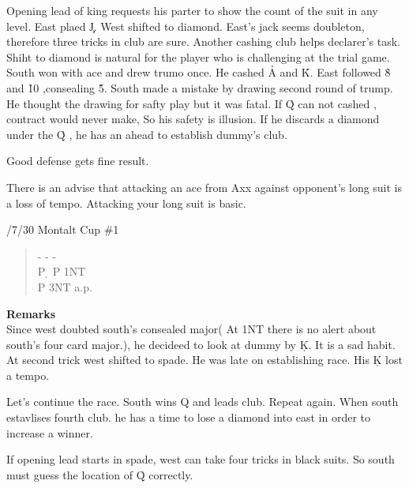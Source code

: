 Opening lead of king requests his parter to show the count of
the suit in any level. East plaed \c J. West shifted to diamond.
East's jack seems doubleton, therefore three tricks in club 
are sure. Another cashing club helps declarer's task.
Shiht to diamond is natural for the player who is challenging
at the trial game. South won with ace and drew trumo once.
He  cashed \h A and \h K. East followed \h 8 and \h 10 ,consealing 
\h 5. South made a mistake by drawing second round of trump.
He thought the drawing for safty play but it was 
fatal. If \h Q can not cashed , contract would never make,
So his safety is illusion. If he discards a diamond under the
\h Q , he has an ahead to establish dummy's club.

Good defense gets fine result.

There is an advise that attacking an ace from Axx against 
opponent's long suit is a loss of tempo.
Attacking your long suit is basic.
\vspace{0.5cm}

/7/30 Montalt Cup   \#1
\begin{quote}
%
  {}%
  {}%
  {}%
  {}%
\end{quote}
\begin{quote}
\begin{bidding}
- \> -  \> - \c \\
P \d \> P \> 1NT \\
P \> 3NT \> a.p.
\end{bidding}
\end{quote}
{\bf Remarks}\\

Since west doubted south's consealed major(
At 1NT there is no alert about south's four card
major.), he decideed to look at dummy by \c K.
It is a sad habit. At second trick west shifted to
spade. He was late on establishing race.
His \c K lost a tempo.

Let's continue the race. South wins \s Q and leads club.
Repeat again. When south estavlises fourth club. he has a
time to lose a diamond into east in order to increase a
winner.

If opening lead starts in spade, west can take four tricks in 
black suits. So south must guess the location of \h Q correctly.

